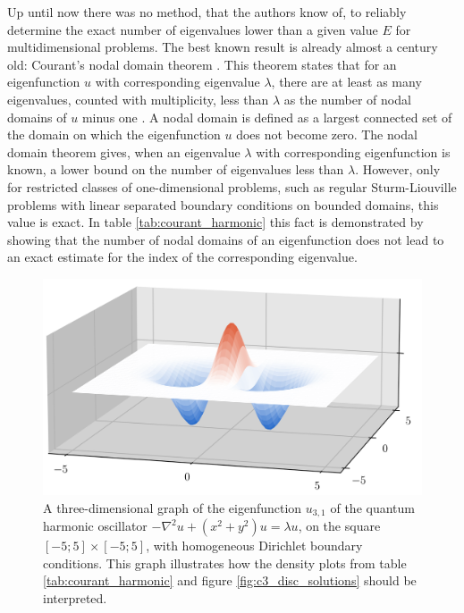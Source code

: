 Up until now there was no method, that the authors know of, to reliably determine the exact number of eigenvalues lower than a given value $E$ for multidimensional problems. The best known result is already almost a century old: Courant's nodal domain theorem \cite[Vol I, Chapter  VI, paragraph 2, Theorem 2]{courant_methods_2008}. This theorem states that for an eigenfunction $u$ with corresponding eigenvalue $\lambda$, there are at least as many eigenvalues, counted with multiplicity, less than $\lambda$ as the number of nodal domains of $u$ minus one \cite[Theorem 1.1]{berard_nodal_2014}. A nodal domain is defined as a largest connected set of the domain on which the eigenfunction $u$ does not become zero. The nodal domain theorem gives, when an eigenvalue $\lambda$ with corresponding eigenfunction is known, a lower bound on the number of eigenvalues less than $\lambda$. However, only for restricted classes of one-dimensional problems, such as regular Sturm-Liouville problems with linear separated boundary conditions on bounded domains, this value is exact. In table \ref{tab:courant_harmonic} this fact is demonstrated by showing that the number of nodal domains of an eigenfunction does not lead to an exact estimate for the index of the corresponding eigenvalue.

\begin{figure}
  \begin{center}
    \includegraphics[width=\linewidth]{img/chapter3/counting/harmonic_3d.png}
    \caption{\label{fig:harmonic_3d} A three-dimensional graph of the eigenfunction $u_{3,1}$ of the quantum harmonic oscillator $-\nabla^2 u + (x^2+y^2) u = \lambda u$, on the square $[-5; 5] \times [-5; 5]$, with homogeneous Dirichlet boundary conditions. This graph illustrates how the density plots from table \ref{tab:courant_harmonic} and figure \ref{fig:c3_disc_solutions} should be interpreted.}
  \end{center}
\end{figure}

